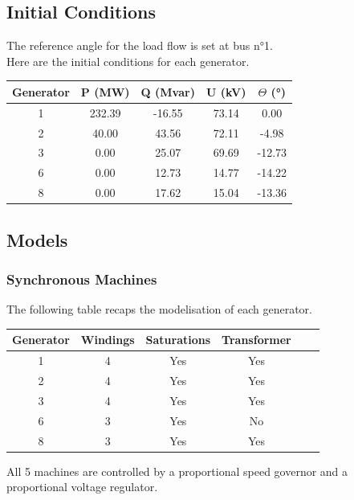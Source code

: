 \documentclass[a4paper, 12pt]{report}
\begin{document}
\subsection{Initial Conditions}

The reference angle for the load flow is set at bus n°1. \\

Here are the initial conditions for each generator.

\begin{center}
\begin{tabular}{|c|c|c|c|c|}
  \hline
  Generator & P (MW) & Q (Mvar) & U (kV) & $\Theta$ (°) \\
  \hline
  1 & 232.39 & -16.55 & 73.14 & 0.00\\
  2 & 40.00 & 43.56 & 72.11 & -4.98\\
  3 & 0.00 & 25.07 & 69.69 & -12.73\\
  6 & 0.00 & 12.73 & 14.77 & -14.22\\
  8 & 0.00 & 17.62 & 15.04 & -13.36\\
  \hline
\end{tabular}
\end{center}

\subsection{Models}

\subsubsection{Synchronous Machines}

The following table recaps the modelisation of each generator.

\begin{center}
\begin{tabular}{|c|c|c|c|c|c|}
  \hline
  Generator & Windings  & Saturations & Transformer\\
  \hline
  1 & 4 & Yes & Yes\\
  2 & 4 & Yes & Yes\\
  3 & 4 & Yes & Yes\\
  6 & 3 & Yes & No\\
  8 & 3 & Yes & Yes\\
  \hline
\end{tabular}
\end{center}

All 5 machines are controlled by a proportional speed governor and a proportional voltage regulator. \\
\end{document}
